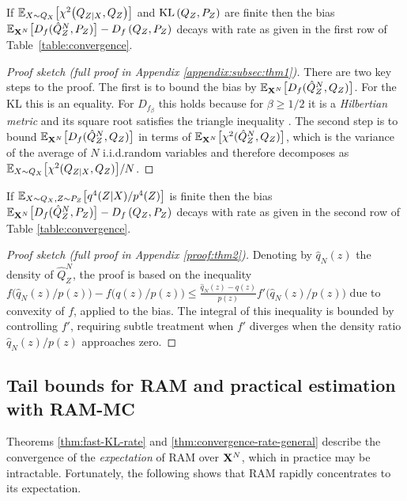 \begin{theorem}\label{thm:fast-KL-rate}
If
$\mathbb{E}_{X\sim Q_X}\bigl[\chi^2\bigl(Q_{Z|X}, Q_Z\bigr)\bigr]$ and
$\mathrm{KL}\left( Q_{Z} , P_Z\right)$ are finite then the bias ${\mathbb{E}_{\mathbf{X}^N}\bigl[D_f( \hat{Q}_Z^N , P_Z)\bigr] - D_f\left( Q_{Z} , P_Z\right)}$ decays with rate as given in the first row of Table~\ref{table:convergence}.
\end{theorem}
\begin{proof}[Proof sketch (full proof in Appendix \ref{appendix:subsec:thm1})]
There are two key steps to the proof. 
The first is to bound the bias by ${\mathbb{E}_{\mathbf{X}^N}\big[D_f(\hat{Q}_Z^N, Q_Z)\big]}$. 
For the KL this is an equality. 
For ${D_{f_\beta}}$ this holds because for $\beta {\geq} 1/2$ it is a \emph{Hilbertian metric} and its square root satisfies the triangle inequality \citep{hein05hilbertian}.
The second step is to bound ${\mathbb{E}_{\mathbf{X}^N}\bigl[D_f(\hat{Q}_Z^N, Q_Z)\bigr]}$ in terms of ${\mathbb{E}_{\mathbf{X}^N}\bigl[\chi^2(\hat{Q}_Z^N, Q_Z)\bigr]}$, which is the variance of the average of $N$ i.i.d.\:random variables and therefore decomposes as ${\mathbb{E}_{X\sim Q_X}\bigl[\chi^2(Q_{Z|X}, Q_Z)\bigr] / N}$.
\end{proof}
%
\begin{theorem}\label{thm:convergence-rate-general}
If $\mathbb{E}_{X\sim Q_X, Z\sim P_Z}\bigl[ q^4(Z|X) / p^4(Z) \bigr]$ is finite then
the bias $\mathbb{E}_{\mathbf{X}^N}\bigl[D_f( \hat{Q}_Z^N , P_Z)\bigr] - D_f\left( Q_{Z} , P_Z\right)$ decays with rate as given in the second row of Table \ref{table:convergence}.
\end{theorem}
\begin{proof}[Proof sketch (full proof in Appendix \ref{proof:thm2})]
Denoting by $\hat{q}_N(z)$ the density of $\hat{Q}_Z^N$,
the proof is based on the inequality
$f\bigl(\hat{q}_N(z) / p(z)\bigr) - f\bigl(q(z) / p(z)\bigr)\leq \frac{\hat{q}_N(z) - q(z)}{p(z)} f'\bigl(\hat{q}_N(z) / p(z)\bigr)$ due to convexity of $f$, applied to the bias.
The integral of this inequality is bounded by controlling $f'$, requiring subtle treatment when $f'$ diverges when the density ratio $\hat{q}_N(z)/p(z)$ approaches zero.
\end{proof}

\subsection{Tail bounds for RAM and practical estimation with RAM-MC}

Theorems \ref{thm:fast-KL-rate} and \ref{thm:convergence-rate-general} describe the convergence of the  \emph{expectation} of RAM over $\mathbf{X}^N$, which in practice may be intractable.
Fortunately, the following shows that RAM rapidly concentrates to its expectation.


